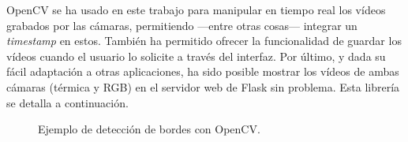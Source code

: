 OpenCV se ha usado en este trabajo para manipular en tiempo real los vídeos grabados por las cámaras, permitiendo ---entre otras cosas--- integrar un \textit{timestamp} en estos. También ha permitido ofrecer la funcionalidad de guardar los vídeos cuando el usuario lo solicite a través del interfaz. Por último, y dada su fácil adaptación a otras aplicaciones, ha sido posible mostrar los vídeos de ambas cámaras (térmica y RGB) en el servidor web de Flask sin problema. Esta librería se detalla a continuación.\\
\begin{figure}[h!]
  \begin{center}
    \hspace{9mm}
    \hspace{9mm}
    \hspace{9mm}
  \end{center}
\caption{Ejemplo de detección de bordes con OpenCV.} \label{fig:ej-opencv}
\end{figure}

